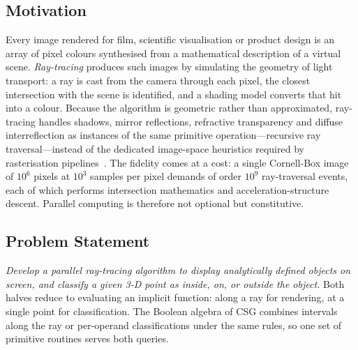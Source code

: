 \documentclass[twocolumn,10pt,cleanhead,cleanfoot]{asme2e}
\begin{document}
\subsection*{Motivation}
Every image rendered for film, scientific visualisation or product design is an array of pixel colours synthesised from a mathematical description of a virtual scene. \emph{Ray-tracing} produces such images by simulating the geometry of light transport: a ray is cast from the camera through each pixel, the closest intersection with the scene is identified, and a shading model converts that hit into a colour. Because the algorithm is geometric rather than approximated, ray-tracing handles shadows, mirror reflections, refractive transparency and diffuse interreflection as instances of the same primitive operation---recursive ray traversal---instead of the dedicated image-space heuristics required by rasterisation pipelines~\cite{whitted1980,kajiya1986}. The fidelity comes at a cost: a single Cornell-Box image of $10^6$ pixels at $10^3$ samples per pixel demands of order $10^9$ ray-traversal events, each of which performs intersection mathematics and acceleration-structure descent. Parallel computing is therefore not optional but constitutive.

\subsection*{Problem Statement}
\emph{Develop a parallel ray-tracing algorithm to display analytically defined objects on screen, and classify a given 3-D point as inside, on, or outside the object.} Both halves reduce to evaluating an implicit function: along a ray for rendering, at a single point for classification. The Boolean algebra of CSG combines intervals along the ray or per-operand classifications under the same rules, so one set of primitive routines serves both queries.
\end{document}
